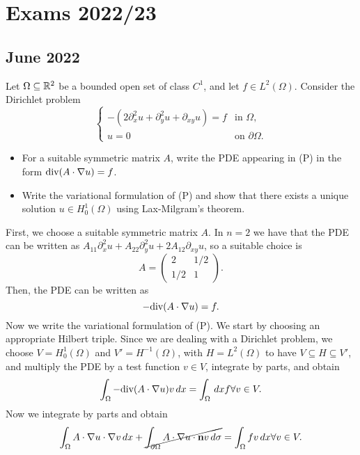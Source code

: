\section{Exams 2022/23}
\subsection{June 2022}
\begin{exercise}
  Let \(\Omega \subseteq \mathbb{R}^2\) be a bounded open set of class \(C^1\), and let \(f \in L^2(\Omega)\). Consider the Dirichlet problem
    \begin{equation*}
        \begin{cases}
        -\left(2\partial_{x}^2 u + \partial_{y}^2 u + \partial_{xy} u\right) = f & \text{in } \Omega, \\
        u = 0 & \text{on } \partial \Omega.
        \end{cases}
        \tag*{(P)}
    \end{equation*}
\begin{itemize}
    \item For a suitable symmetric matrix \(A\), write the PDE appearing in (P) in the form \(\text{div}(A \cdot \nabla u) = f\).
    \item Write the variational formulation of (P) and show that there exists a unique solution \(u \in H_0^1(\Omega)\) using Lax-Milgram's theorem.
\end{itemize}
\end{exercise}
First, we choose a suitable symmetric matrix \(A\). In \(n = 2\) we have that the PDE can be written as \(A_{11} \partial_{x}^2 u + A_{22} \partial_{y}^2 u + 2A_{12} \partial_{xy} u\), so a suitable choice is
\[
A = \begin{pmatrix}
2 & 1/2 \\
1/2 & 1
\end{pmatrix}.
\]
Then, the PDE can be written as
\[
 - \text{div}(A \cdot \nabla u) = f.
\]
Now we write the variational formulation of (P). We start by choosing an appropriate Hilbert triple. Since we are dealing with a Dirichlet problem, we choose \(V = H_0^1(\Omega)\) and \(V' = H^{-1}(\Omega)\), with \(H = L^2(\Omega)\) to have \(V \subseteq H \subseteq V'\), and multiply the PDE by a test function \(v \in V\), integrate by parts, and obtain
\[
\int_{\Omega} - \text{div}(A \cdot \nabla u) v \, dx = \int_{\Omega} \, dx f \forall v \in V.
\]
Now we integrate by parts and obtain
\[
\int_{\Omega} A \cdot \nabla u \cdot \nabla v \, dx + \cancel{\int_{\partial \Omega} A \cdot \nabla u \cdot \textbf{n} v \, d\sigma}= \int_{\Omega} f v \, dx \forall v \in V.
\]
